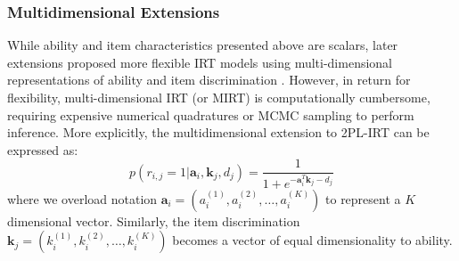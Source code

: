 \subsubsection{Multidimensional Extensions}

While ability and item characteristics presented above are scalars, later extensions proposed more flexible IRT models using multi-dimensional representations of ability and item discrimination \cite{ackerman1994using,mcdonald2000basis,reckase2009multidimensional}.
However, in return for flexibility, multi-dimensional IRT (or MIRT) is computationally cumbersome, requiring expensive numerical quadratures \cite{liu1994note,naylor1982applications} or MCMC sampling \cite{houts2015flexmirt}  to perform inference. 
More explicitly, the multidimensional extension to 2PL-IRT can be expressed as:
\begin{equation}
    p(r_{i,j}=1|\textbf{a}_i, \textbf{k}_j, d_j) = \frac{1}{1 + e^{-\textbf{a}_i^T \textbf{k}_j - d_j}}
\label{eq:3pl_mirt}
\end{equation}
where we overload notation $\textbf{a}_i = \left(a^{(1)}_i, a^{(2)}_i, \ldots, a^{(K)}_i\right)$ to represent a $K$ dimensional vector. Similarly, the item discrimination $\textbf{k}_j = \left(k^{(1)}_i, k^{(2)}_i, \ldots, k^{(K)}_i\right)$ becomes a vector of equal dimensionality to ability.

